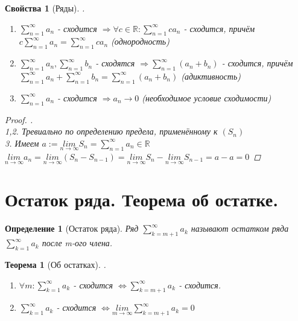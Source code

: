 \documentclass[11pt,a4paper,titlepage]{article}
\newtheorem*{theorem}{Теорема}
\newtheorem*{definition}{Определение}
\newtheorem*{properties}{Свойства}
\renewcommand{\lim}[2]{\underset{#1 \rightarrow #2}{lim}}
\newcommand{\limn}{\lim{n}{\infty}}
\renewcommand{\implies}{\Rightarrow}
\renewcommand{\iff}{\Leftrightarrow}
\newcommand{\R}{\mathbb{R}}
\begin{document}
    \begin{properties}[Ряды]
        .\\
        \begin{enumerate}
            \item $\sum_{n=1}^\infty a_n$ - сходится $\implies \forall c \in \R: \sum_{n=1}^\infty c a_n$ - сходится, причём $c\sum_{n=1}^\infty a_n = \sum_{n=1}^\infty c a_n$ (однородность)
            \item $\sum_{n=1}^\infty a_n, \sum_{n=1}^\infty b_n$ - сходятся $\implies \sum_{n=1}^\infty(a_n + b_n)$ - сходится, причём $\sum_{n=1}^\infty a_n + \sum_{n=1}^\infty b_n = \sum_{n=1}^\infty (a_n+b_n)$ (адиктивность)
            \item $\sum_{n=1}^\infty a_n$ - сходится $\implies a_n \to 0$ (необходимое условие сходимости)
        \end{enumerate}

        \begin{proof}
            .\\
            1,2. Тревиально по определению предела, применённому к $(S_n)$\\
            3. Имеем $a := \limn S_n = \sum_{n=1}^\infty a_n \in \R$\\
            $\limn a_n = \limn (S_n - S_{n-1}) = \limn S_n - \limn S_{n-1} = a - a = 0$
        \end{proof}
    \end{properties}


    \section{ Остаток ряда. Теорема об остатке.}

    \begin{definition}[Остаток ряда]
        Ряд $\sum_{k=m+1}^\infty a_k$ называют остатком ряда $\sum_{k=1}^\infty a_k$ после m-ого члена.
    \end{definition}

    \begin{theorem}[Об остатках]
        .\\
        \begin{enumerate}
            \item $\forall m: \sum_{k=1}^\infty a_k$ - сходится $\iff \sum_{k=m+1}^\infty a_k$ - сходится.
            \item $\sum_{k=1}^\infty a_k$ - сходится $\iff \lim{m}{\infty}\sum_{k=m+1}^\infty a_k = 0$
        \end{enumerate}
    \end{theorem}
\end{document}
